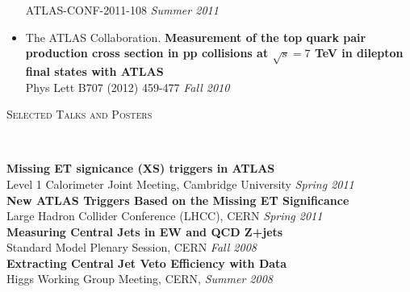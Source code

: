 \documentclass[9pt]{article}
\newenvironment{changemargin}[2]{%
  \begin{list}{}{%
    \setlength{\topsep}{0pt}%
    \setlength{\leftmargin}{#1}%
    \setlength{\rightmargin}{#2}%
    \setlength{\listparindent}{\parindent}%
    \setlength{\itemindent}{\parindent}%
    \setlength{\parsep}{\parskip}%
  }%
  \item[]}{\end{list}
}
\newcommand{\lineover}{
	\begin{changemargin}{-0.05in}{-0.05in}
		\vspace*{-8pt}
		\hrulefill \\
		\vspace*{-2pt}
	\end{changemargin}
}
\newcommand{\header}[1]{
	\begin{changemargin}{-0.5in}{-0.5in}
		\scshape{#1}\\
  	\lineover
	\end{changemargin}
}
\newenvironment{body} {
	\vspace*{-16pt}
	\begin{changemargin}{-0.25in}{-0.5in}
  }	
	{\end{changemargin}
}
\begin{document}
\begin{body}
\begin{itemize}
    ATLAS-CONF-2011-108 \hfill \emph{Summer 2011} \\
    \medskip
  \item The ATLAS Collaboration. \textbf{Measurement of the top quark pair production cross section in pp collisions at $\sqrt{s}=7$ TeV in dilepton final states with ATLAS} \\
    Phys Lett B707 (2012) 459-477 \hfill \emph{Fall 2010} \\
  \end{itemize}
\end{body}

\smallskip

\header{Selected Talks and Posters}
\begin{body}
	\vspace{14pt}
        \textbf{Missing ET signicance (XS) triggers in ATLAS} \\
        Level 1 Calorimeter Joint Meeting, Cambridge University \hfill \emph{Spring 2011} \\
        \medskip
        \textbf{New ATLAS Triggers Based on the Missing ET Significance} \\
        Large Hadron Collider Conference (LHCC), CERN \hfill \emph{Spring 2011} \\
        \medskip
        \textbf{Measuring Central Jets in EW and QCD Z+jets} \\
        Standard Model Plenary Session, CERN \hfill  \emph{Fall 2008} \\
        \medskip
        \textbf{Extracting Central Jet Veto Efficiency with Data} \\
        Higgs Working Group Meeting, CERN, \hfill \emph{Summer 2008} \\

\end{body}

\smallskip
\end{document}

